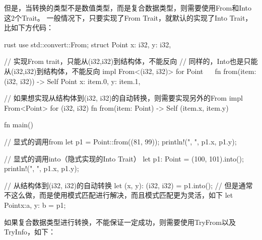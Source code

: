 但是，当转换的类型不是数值类型，而是复合数据类型，则需要使用From和Into这2个Trait。
一般情况下，只要实现了From Trait，就默认的实现了Into Trait，比如下方代码：
\begin{code-block}[escapeinside=~~,mathescape]{rust}
use std::convert::From;
struct Point {
    x: i32,
    y: i32,
}

// 实现From trait，只能从(i32,i32)到结构体，不能反向
// 同样的，Into也是只能从(i32,i32)到结构体，不能反向
impl From<(i32, i32)> for Point { ~~
    fn from(item: (i32, i32)) -> Self {
        Point {
            x: item.0,
            y: item.1,
        }
    }
}

// 如果想实现从结构体到(i32, i32)的自动转换，则需要实现另外的From
impl From<Point> for (i32, i32) {
    fn from(item: Point) -> Self {
        (item.x, item.y)
    }
}

fn main() {
    // 显式的调用from
    let p1 = Point::from((81, 99));
    println!("{}, {}", p1.x, p1.y);

    // 显式的调用into（隐式实现的Into Trait）
    let p1: Point = (100, 101).into();
    println!("{}, {}", p1.x, p1.y);

    // 从结构体到(i32, i32)的自动转换
    let (x, y): (i32, i32) = p1.into();
    // 但是通常不这么做，而是使用模式匹配进行解决，而且模式匹配更为灵活，如下
    let Point{x:a, y: b} = p1;
}
\end{code-block}

如果复合数据类型进行转换，不能保证一定成功，则需要使用TryFrom以及TryInfo，如下：

